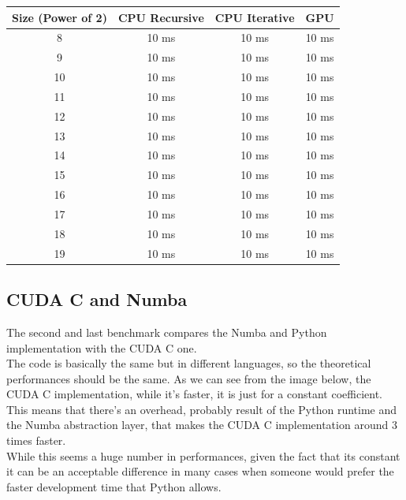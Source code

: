 \documentclass[a4paper, 12pt, oneside]{article}
\begin{document}
\begin{center}
  \begin{tabular}{ |c|c|c|c| }
    \hline
    \textbf{Size (Power of 2)} & \textbf{CPU Recursive} & \textbf{CPU Iterative} & \textbf{GPU} \\
    \hline
    8                          & 10 ms                  & 10 ms                  & 10 ms        \\
    9                          & 10 ms                  & 10 ms                  & 10 ms        \\
    10                         & 10 ms                  & 10 ms                  & 10 ms        \\
    11                         & 10 ms                  & 10 ms                  & 10 ms        \\
    12                         & 10 ms                  & 10 ms                  & 10 ms        \\
    13                         & 10 ms                  & 10 ms                  & 10 ms        \\
    14                         & 10 ms                  & 10 ms                  & 10 ms        \\
    15                         & 10 ms                  & 10 ms                  & 10 ms        \\
    16                         & 10 ms                  & 10 ms                  & 10 ms        \\
    17                         & 10 ms                  & 10 ms                  & 10 ms        \\
    18                         & 10 ms                  & 10 ms                  & 10 ms        \\
    19                         & 10 ms                  & 10 ms                  & 10 ms        \\
    \hline
  \end{tabular}
\end{center}

\subsection{CUDA C and Numba}

The second and last benchmark compares the Numba and Python implementation with the CUDA C one.\\
The code is basically the same but in different languages, so the theoretical performances should be the same.
As we can see from the image below, the CUDA C implementation, while it's faster, it is just for a constant coefficient.\\
This means that there's an overhead, probably result of the Python runtime and the Numba abstraction layer, that makes the CUDA C implementation around 3 times faster.\\
While this seems a huge number in performances, given the fact that its constant it can be an acceptable difference in many cases when someone would prefer the faster development time that Python allows.
\end{document}
